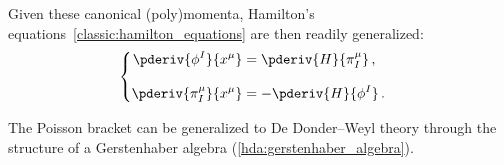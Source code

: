 
    Given these canonical (poly)momenta, Hamilton's equations~\ref{classic:hamilton_equations} are then readily generalized:
    \begin{gather}
        \begin{cases}
            \begin{aligned}
                \pderiv{\phi^I}{x^\mu} &= \pderiv{H}{\pi^\mu_I}\,,\\\\
                \pderiv{\pi^\mu_I}{x^\mu} &= -\pderiv{H}{\phi^I}\,.
            \end{aligned}
        \end{cases}
    \end{gather}

    \begin{remark}[Bracket]
        The Poisson bracket can be generalized to De Donder--Weyl theory through the structure of a Gerstenhaber algebra (\cref{hda:gerstenhaber_algebra}).
    \end{remark}